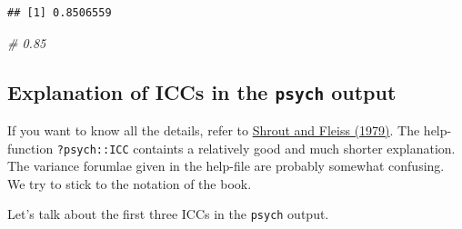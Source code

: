 \documentclass[
]{book}
\newenvironment{Shaded}{\begin{snugshade}}{\end{snugshade}}
\newcommand{\CommentTok}[1]{\textcolor[rgb]{0.56,0.35,0.01}{\textit{#1}}}
\begin{document}
\begin{verbatim}
## [1] 0.8506559
\end{verbatim}

\begin{Shaded}
\begin{Highlighting}[]
\CommentTok{\# 0.85}
\end{Highlighting}
\end{Shaded}

\subsection{\texorpdfstring{Explanation of ICCs in the \texttt{psych} output}{Explanation of ICCs in the psych output}}\label{explanation-of-iccs-in-the-psych-output}

If you want to know all the details, refer to \href{https://d1wqtxts1xzle7.cloudfront.net/50483847/syarat_reliabilitas_icc-libre.pdf?1479841049=&response-content-disposition=inline\%3B+filename\%3DIntraclass_Correlations_Uses_in_Assessin.pdf&Expires=1740684631&Signature=hHiFbcQD3PDVIyWDJ-bUhcm3WtsK19YhHm6FKtnafNdqsm9NhR6cr9lbCf~gVV5SYG1XlTwLlcfJkQ9Z-ahjmmNV893aWi5plo~yL4oZBEjrmFa9WCd7k6vzFTkri1Xbgfh~GyPARWXBtqABytovtL-RD1420Kw9qk150nw3-kUWcuvRiIc~r0y65XQaXf-V9mm~uXRFdUqec4Vs-Bwh~IrJfHWQASGgp8wZjzh2130MCP3-iaorxNn~79c~nm2f1aIl5WRqRXB6EIy8HlrNFpxNSt1pgTPZoZadEECM4qH395KLY5ijUnhoCDT9AmcOplPnFiC5t8dKW-n25ziofQ__&Key-Pair-Id=APKAJLOHF5GGSLRBV4ZA}{Shrout and Fleiss (1979)}.
The help-function \texttt{?psych::ICC} containts a relatively good and much shorter explanation.
The variance forumlae given in the help-file are probably somewhat confusing.
We try to stick to the notation of the book.

Let's talk about the first three ICCs in the \texttt{psych} output.
\end{document}
